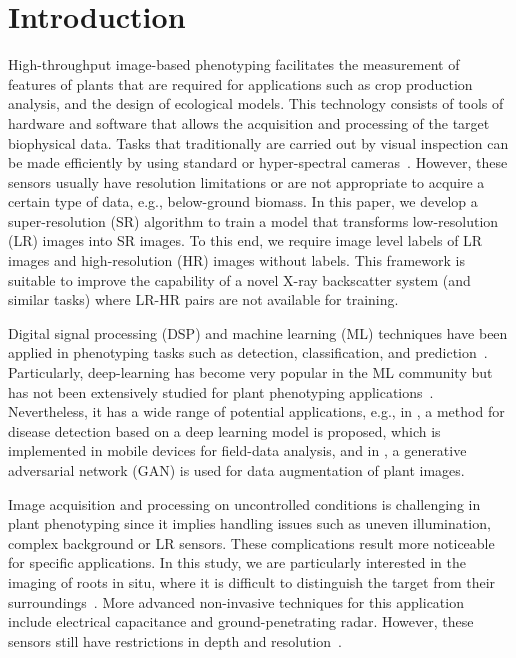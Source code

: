 \documentclass[10pt,twocolumn,letterpaper]{article}
\begin{document}
\section{Introduction}
High-throughput image-based phenotyping facilitates the measurement of features of plants that are required for applications such as crop production analysis, and the design of ecological models. This technology consists of tools of hardware and software that allows the acquisition and processing of the target biophysical data. Tasks that traditionally are carried out by visual inspection can be made efficiently by using standard or hyper-spectral cameras~\cite{Fahlgren2015}. However, these sensors usually have resolution limitations or are not appropriate to acquire a certain type of data, e.g., below-ground biomass. In this paper, we develop a super-resolution (SR) algorithm to train a model that transforms low-resolution (LR) images into SR images. To this end, we require image level labels of LR images and high-resolution (HR) images without labels. This framework is suitable to improve the capability of a novel X-ray backscatter system (and similar tasks) where LR-HR pairs are not available for training.

Digital signal processing (DSP) and machine learning (ML) techniques have been applied in phenotyping tasks such as detection, classification, and prediction~\cite{Singh2018}. Particularly, deep-learning has become very popular in the ML community but has not been extensively studied for plant phenotyping applications~\cite{Ubbens2017}. Nevertheless, it has a wide range of potential applications, e.g., in \cite{Ramcharan2017}, a method for disease detection based on a deep learning model is proposed, which is implemented in mobile devices for field-data analysis, and in \cite{Giuffrida2017}, a generative adversarial network (GAN) is used for data augmentation of plant images.

Image acquisition and processing on uncontrolled conditions is challenging in plant phenotyping since it implies handling issues such as uneven illumination, complex background or LR sensors. These complications result more noticeable for specific applications. In this study, we are particularly interested in the imaging of roots in situ, where it is difficult to distinguish the target from their surroundings~\cite{Tabb2018}. More advanced non-invasive techniques for this application include electrical capacitance and ground-penetrating radar. However, these sensors still have restrictions in depth and resolution~\cite{Araus2014}.
\end{document}
